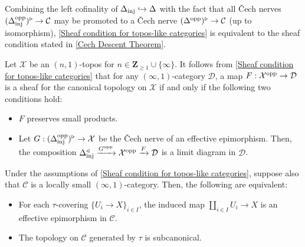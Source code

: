 \documentclass[10pt]{article}
\newcommand{\C}{\mathcal C}
\newcommand{\cD}{\mathcal{D}}
\newcommand{\cX}{\mathcal{X}}
\newcommand{\ZZ}{\mathbb{Z}}
\def\ZZ{{\mathbf Z}}
\theoremstyle{witharg}
\theoremstyle{witharg}
\theoremstyle{witharg2}
\begin{document}
\begin{remark}{}

    Combining the left cofinality of $\Delta_{\textnormal{inj}}\hookrightarrow \Delta$ with the fact that all \v{C}ech nerves $(\Delta^{\textnormal{opp}}_{\textnormal{inj}})^\triangleright\rightarrow \C$ may be promoted to a \v{C}ech nerve $(\Delta^{\textnormal{opp}})^\triangleright\rightarrow \C$ (up to isomorphism), \ref{Sheaf condition for topos-like categories} is equivalent to the sheaf condition stated in \ref{Cech Descent Theorem}. 
    
\end{remark}


\begin{example}{}\label{preservation of trunactions 1}

    Let $\cX$ be an $(n,1)$-topos for $n\in \ZZ_{\geq 1}\cup \{\infty\}$. It follows from \ref{Sheaf condition for topos-like categories} that for any $(\infty,1)$-category $\cD$, a map $F:\cX^{\textnormal{opp}}\rightarrow \cD$ is a sheaf for the canonical topology on $\cX$ if and only if the following two conditions hold:

    \begin{itemize}
        \item [$(1)$] $F$ preserves small products.
        
        \item [$(2)$] Let $G:(\Delta_{\textnormal{inj}}^{\textnormal{opp}})^\triangleright\rightarrow \cX$ be the \v{C}ech nerve of an effective epimorphism. Then, the composition $\Delta_{\textnormal{inj}}^\triangleleft\xrightarrow{G^{\textnormal{opp}}} \cX^{\textnormal{opp}}\xrightarrow{F}\cD$ is a limit diagram in $\cD$. 
        
    \end{itemize}

    
\end{example}



\begin{corollary}{}\label{Subcanonical Topologies for topos-like categories}

    Under the assumptions of \ref{Sheaf condition for topos-like categories}, suppose also that $\C$ is a locally small $(\infty,1)$-category. Then, the following are equivalent:

    \begin{itemize}
        \item [$(1)$] For each $\tau$-covering $\{U_i\rightarrow X\}_{i\in I}$, the induced map $\coprod_{i\in I}U_i\rightarrow X$ is an effective epimorphism in $\C$. 
    
        \item [$(2)$] The topology on $\C$ generated by $\tau$ is subcanonical. 
    \end{itemize}

    
\end{corollary}
\end{document}
